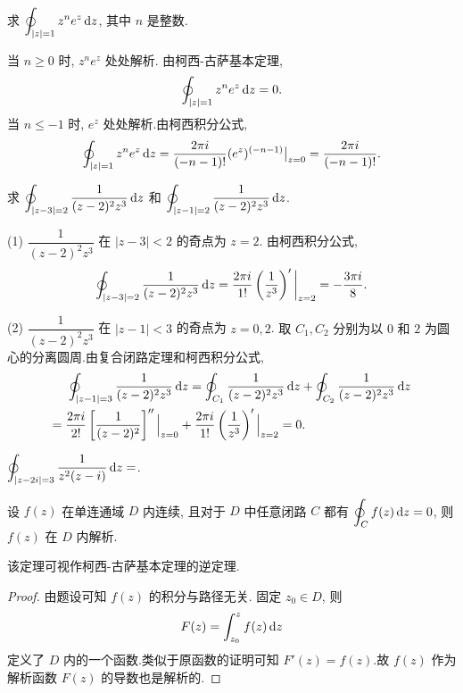 \documentclass[nocolor,theme=doremi,lang=cn,11pt,chinese,twoside,openright,usesamecnt]{elegantbook}
\newcommand\enumnum[1]{{\mdseries\upshape\textcolor[rgb]{.2,.2,.7}{(#1)}}}
\newcommand\peq{\mathrel{\phantom{=}}} %
\begin{document}
\begin{example}
	求 $\displaystyle\oint_{|z|=1}z^ne^z\,\mathrm{d} z$, 其中 $n$ 是整数.
\end{example}

\begin{solution}
	当 $n\ge 0$ 时, $z^ne^z$ 处处解析.
	{由柯西-古萨基本定理, 
		\[\oint_{|z|=1}z^ne^z\,\mathrm{d} z=0.\]当 $n\le-1$ 时, $e^z$ 处处解析.由柯西积分公式,
		\[\oint_{|z|=1}z^ne^z\,\mathrm{d} z
		=\frac{2\pi i}{(-n-1)!}(e^z)^{(-n-1)}\big|_{z=0}
		=\frac{2\pi i}{(-n-1)!}.\]}
\end{solution}

\begin{example}
	求 $\displaystyle\oint_{|z-3|=2}\frac1{(z-2)^2z^3}\,\mathrm{d} z$ 和 $\displaystyle\oint_{|z-1|=2}\frac1{(z-2)^2z^3}\,\mathrm{d} z$.
\end{example}

\begin{solution}
	\enumnum1 $\dfrac1{(z-2)^2z^3}$ 在 $|z-3|<2$ 的奇点为 $z=2$.
	{由柯西积分公式,
		\[\oint_{|z-3|=2}\frac1{(z-2)^2z^3}\,\mathrm{d} z
		=\frac{2\pi i}{1!}\left(\frac1{z^3}\right)'\bigg|_{z=2}
		=-\frac{3\pi i}8.\]}

	\enumnum2 $\dfrac1{(z-2)^2z^3}$ 在 $|z-1|<3$ 的奇点为 $z=0,2$.
	{取 $C_1,C_2$ 分别为以 $0$ 和 $2$ 为圆心的分离圆周.由复合闭路定理和柯西积分公式,
		\begin{align*}
		&\peq\oint_{|z-1|=3}\frac1{(z-2)^2z^3}\diff z=\oint_{C_1}\frac1{(z-2)^2z^3}\diff z+\oint_{C_2}\frac1{(z-2)^2z^3}\diff z\\
		&{=\frac{2\pi i}{2!}\left[\frac1{(z-2)^2}\right]''\Big|_{z=0}+\frac{2\pi i}{1!}\left(\frac1{z^3}\right)'\Big|_{z=2}=0.}
		\end{align*}}
\end{solution}

\begin{exercise}
	$\displaystyle\oint_{|z-2i|=3}\frac1{z^2(z-i)}\,\mathrm{d} z=$.
\end{exercise}

\begin{example}[莫累拉定理]
	设 $f(z)$ 在单连通域 $D$ 内连续, 且对于 $D$ 中任意闭路 $C$ 都有 $\displaystyle\oint_Cf(z)\,\mathrm{d} z=0$, 则 $f(z)$ 在 $D$ 内解析.
\end{example}

该定理可视作柯西-古萨基本定理的逆定理.

\begin{proof}
	由题设可知 $f(z)$ 的积分与路径无关.
	{固定 $z_0\in D$, 则
		\[F(z)=\int_{z_0}^zf(z)\,\mathrm{d} z\]
	定义了 $D$ 内的一个函数.类似于原函数的证明可知 $F'(z)=f(z)$.故 $f(z)$ 作为解析函数 $F(z)$ 的导数也是解析的.\qedhere}
\end{proof}
\end{document}
